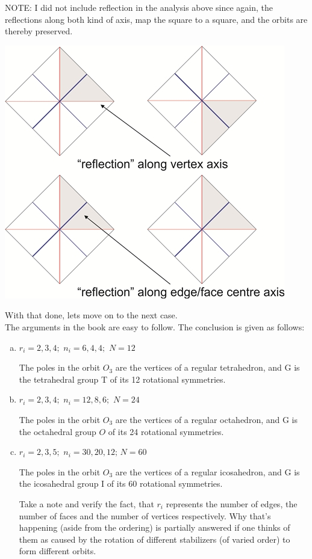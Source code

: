 \documentclass[12pt]{article}
\begin{document}
\par
NOTE: I did not include reflection in the analysis above since again, the reflections along both kind of axis, map the square to a square, and the orbits are thereby preserved.\\
\begin{center}
\includegraphics[width=0.4\linewidth]{Chapter_6_images/square_reflections.jpg}
\end{center}
\vspace{40pt}
With that done, lets move on to the next case.\\
The arguments in the book are easy to follow. The conclusion is given as follows:
\begin{enumerate}[(a)]
\item $r_{i}=2,3,4;\,\,n_{i}=6,4,4;\,\,N=12$
\par
The poles in the orbit $O_{3}$ are the vertices of a regular tetrahedron, and G is the tetrahedral group T of its 12 rotational symmetries.
\item $r_{i}=2,3,4;\,\,n_{i}=12,8,6;\,\,N=24$
\par
The poles in the orbit $O_{3}$ are the vertices of a regular octahedron, and G is the octahedral group $O$ of its 24 rotational symmetries.
\item $r_{i}=2,3,5;\,\,n_{i}=30,20,12;\,N=60$
\par
The poles in the orbit $O_{3}$ are the vertices of a regular icosahedron, and G is the icosahedral group I of its 60 rotational symmetries.\\
\par
Take a note and verify the fact, that $r_{i}$ represents the number of edges, the number of faces and the number of vertices respectively. Why that's happening (aside from the ordering) is partially answered if one thinks of them as caused by the rotation of different stabilizers (of varied order) to form different orbits.\\
\end{enumerate}
\par
\end{document}

